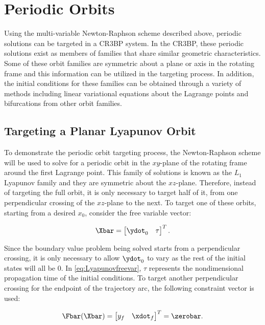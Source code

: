 \section{Periodic Orbits}
Using the multi-variable Newton-Raphson scheme described above, periodic solutions can be targeted
in a CR3BP system. In the CR3BP, these periodic solutions exist as members of families that share
similar geometric characteristics. Some of these orbit families are symmetric about a plane or axis
in the rotating frame and this information can be utilized in the targeting process. In addition,
the initial conditions for these families can be obtained through a variety of methods including
linear variational equations about the Lagrange points and bifurcations from other orbit families.

\subsection{Targeting a Planar Lyapunov Orbit}
To demonstrate the periodic orbit targeting process, the Newton-Raphson scheme will be used to
solve for a periodic orbit in the $xy$-plane of the rotating frame around the first Lagrange point.
This family of solutions is known as the $L_{1}$ Lyapunov family and they are symmetric about the
$xz$-plane. Therefore, instead of targeting the full orbit, it is only necessary to target half of
it, from one perpendicular crossing of the $xz$-plane to the next. To target one of these orbits,
starting from a desired $x_{0}$, consider the free variable vector:

\begin{equation}
    \Xbar=\begin{bmatrix}   \ydot_{0}   &   \tau    \end{bmatrix}^{T}.
    \label{eq:Lyapunovfreevar}
\end{equation}

Since the boundary value problem being solved starts from a perpendicular crossing, it is only
necessary to allow $\ydot_{0}$ to vary as the rest of the initial states will all be $0$. In
\cref{eq:Lyapunovfreevar}, $\tau$ represents the nondimensional propagation time of the initial
conditions. To target another perpendicular crossing for the endpoint of the trajectory arc, the
following constraint vector is used:

\begin{equation}
    \Fbar(\Xbar)=\begin{bmatrix}    y_{f}   &   \xdot_{f}   \end{bmatrix}^{T}=\zerobar.
    \label{eq:Lyapunovconst}
\end{equation}

